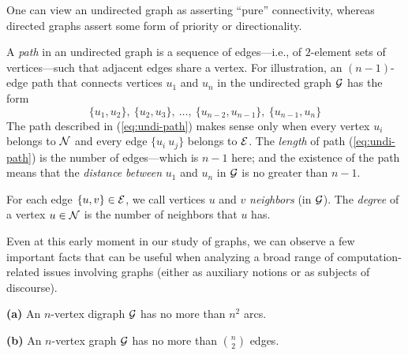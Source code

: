 \medskip

One can view an undirected graph as asserting ``pure'' connectivity,
whereas directed graphs assert some form of priority or directionality.

\medskip

 
A {\it path} in an undirected graph 
is a sequence of edges---i.e., of $2$-element sets of vertices---such
that adjacent edges share a vertex.  For illustration, an $(n-1)$-edge
path that connects vertices $u_1$ and $u_n$ in the undirected graph $\mbox{$\cal G$}$
has the form
\begin{equation}
\label{eq:undi-path}
\{u_1, u_2\}, \ \{u_2, u_3\}, \ \ldots, \ \{u_{n-2}, u_{n-1}\}, \ \{u_{n-1}, u_{n}\}
\end{equation}
The path described in (\ref{eq:undi-path}) makes sense only when every
vertex $u_i$ belongs to $\mbox{$\cal N$}$ and every edge $\{u_i \ u_j\}$ belongs
to $\mbox{$\cal E$}$.  The {\it length} of path (\ref{eq:undi-path}) is the
number of edges---which is $n-1$ here; and the existence of
the path means that the {\it distance}  
{\it between} $u_1$ and $u_n$ in $\mbox{$\cal G$}$ is no greater than $n-1$.  

\medskip

For each edge $\{u,v\} \in \mbox{$\cal E$}$, we call vertices $u$ and $v$ {\it neighbors} (in $\mbox{$\cal G$}$).
The {\it degree} of a vertex $u \in \mbox{$\cal N$}$ is the number of neighbors that $u$ has.

Even at this early moment in our study of graphs, we can observe a few
important facts that can be useful when analyzing a broad range of
computation-related issues involving graphs (either as auxiliary
notions or as subjects of discourse).

\begin{prop}
\label{thm:number-edges/arcs}
{\bf (a)}
An $n$-vertex digraph $\mbox{$\cal G$}$ has no more than $n^2$ arcs.

{\bf (b)}
An $n$-vertex graph $\mbox{$\cal G$}$ has no more than $\displaystyle {n \choose 2}$ edges.
\end{prop}

